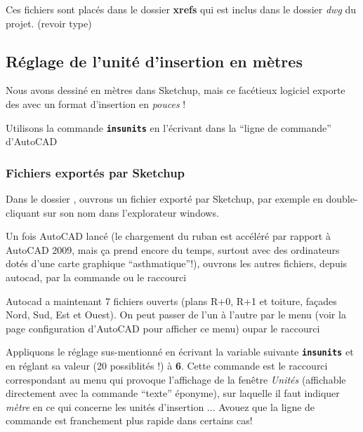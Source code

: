 \documentclass[a4paper,12pt,french]{sphinxmanual}
\begin{document}
Ces fichiers sont placés dans le dossier \textbf{xrefs} qui est inclus dans le dossier \emph{dwg} du projet. (revoir {\hyperref[init_su+acad/002_demarrage:arborescence\string-projet]{}}  type)


\subsection{Réglage de l'unité d'insertion en mètres}
\label{init_su+acad/004_acad1:reglage-de-l-unite-d-insertion-en-metres}
Nous avons dessiné en mètres dans Sketchup, mais ce facétieux logiciel exporte des  avec un format d'insertion en \emph{pouces} !

Utilisons la commande \textbf{\texttt{insunits}} en l'écrivant dans la ``ligne de commande'' d'AutoCAD


\subsubsection{Fichiers exportés par Sketchup}
\label{init_su+acad/004_acad1:fichiers-exportes-par-su}
Dans le dossier , ouvrons un fichier exporté par Sketchup, par exemple  en double-cliquant sur son nom dans l'explorateur windows.

Un fois AutoCAD lancé (le chargement du ruban est accéléré par rapport à AutoCAD 2009, mais ça prend encore du temps, surtout avec des ordinateurs dotés d'une carte graphique ``asthmatique''!), ouvrons les autres fichiers, depuis autocad, par la commande  ou le raccourci 

Autocad a maintenant 7 fichiers ouverts (plans R+0, R+1 et toiture, façades Nord, Sud, Est et Ouest). On peut passer de l'un à l'autre par le menu  (voir la page configuration d'AutoCAD pour afficher ce menu) oupar le raccourci 

Appliquons le réglage sus-mentionné en écrivant la variable suivante \textbf{\texttt{insunits}} et en réglant sa valeur (20 possiblités !) à \textbf{6}. Cette commande est le raccourci correspondant au menu  qui provoque l'affichage de la fenêtre \emph{Unités} (affichable directement avec la commande ``texte'' éponyme), sur laquelle il faut indiquer \emph{mètre} en ce qui concerne les unités d'insertion ... Avouez que la ligne de commande est franchement plus rapide dans certains cas!
\end{document}
